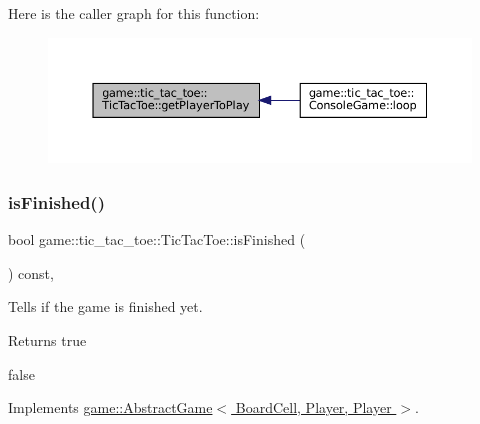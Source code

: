 Here is the caller graph for this function\+:
\nopagebreak
\begin{figure}[H]
\begin{center}
\leavevmode
\includegraphics[width=350pt]{classgame_1_1tic__tac__toe_1_1_tic_tac_toe_ae460add5608bc785e202c876dea8f9ba_icgraph}
\end{center}
\end{figure}
\mbox{\label{classgame_1_1tic__tac__toe_1_1_tic_tac_toe_a06463011bee6de3d33946f9162970989}} 
\subsubsection{\texorpdfstring{is\+Finished()}{isFinished()}}
{\footnotesize\ttfamily bool game\+::tic\+\_\+tac\+\_\+toe\+::\+Tic\+Tac\+Toe\+::is\+Finished (\begin{DoxyParamCaption}{ }\end{DoxyParamCaption}) const\hspace{0.3cm}{\ttfamily [override]}, {\ttfamily [virtual]}}



Tells if the game is finished yet. 

\begin{DoxyReturn}{Returns}
true 

false 
\end{DoxyReturn}


Implements \hyperlink{classgame_1_1_abstract_game_a598679eebf40ccc300e9065bce875fd1}{game\+::\+Abstract\+Game$<$ Board\+Cell, Player, Player $>$}.

